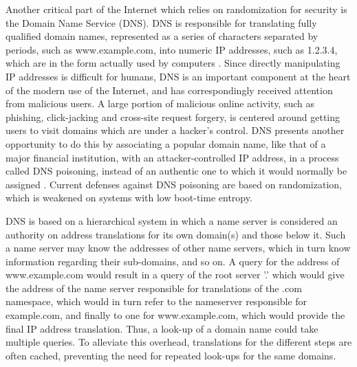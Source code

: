 Another critical part of the Internet which relies on randomization for security is the Domain Name Service (DNS).  DNS is responsible for translating fully qualified domain names, represented as a series of characters separated by periods, such as www.example.com, into numeric IP addresses, such as 1.2.3.4, which are in the form actually used by computers \cite{illustrated}.  Since directly manipulating IP addresses is difficult for humans, DNS is an important component at the heart of the modern use of the Internet, and has correspondingly received attention from malicious users.  A large portion of malicious online activity, such as phishing, click-jacking and cross-site request forgery, is centered around getting users to visit domains which are under a hacker's control\cite{phishing, csrf, clickjack}.  DNS presents another opportunity to do this by associating a popular domain name, like that of a major financial institution, with an attacker-controlled IP address, in a process called DNS poisoning, instead of an authentic one to which it would normally be assigned \cite{DNSPoison}.  Current defenses against DNS poisoning are based on randomization, which is weakened on systems with low boot-time entropy.

DNS is based on a hierarchical system in which a name server is considered an authority on address translations for its own domain(s) and those below it.  Such a name server may know the addresses of other name servers, which in turn know information regarding their sub-domains, and so on.  A query for the address of www.example.com would result in a query of the root server '.' which would give the address of the name server responsible for translations of the .com namespace, which would in turn refer to the nameserver responsible for example.com, and finally to one for www.example.com, which would provide the final IP address translation.  Thus, a look-up of a domain name could take multiple queries.  To alleviate this overhead, translations for the different steps are often cached, preventing the need for repeated look-ups for the same domains.   

